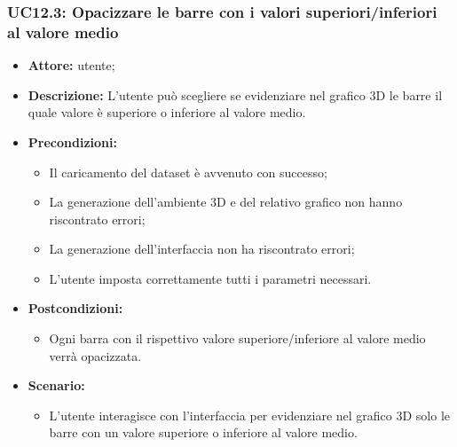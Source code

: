 \subsubsection{UC12.3: Opacizzare le barre con i valori superiori/inferiori al valore medio}
\begin{itemize}    
    \item \textbf{Attore:} utente;
    \item \textbf{Descrizione:} L'utente può scegliere se evidenziare nel grafico 3D le barre il quale valore è superiore o inferiore al valore medio.
    \item \textbf{Precondizioni:}    
        \begin{itemize}
            \item Il caricamento del dataset è avvenuto con successo;
            \item La generazione dell'ambiente 3D e del relativo grafico non hanno riscontrato errori;
            \item La generazione dell'interfaccia non ha riscontrato errori;
            \item L'utente imposta correttamente tutti i parametri necessari.
        \end{itemize}    
    \item \textbf{Postcondizioni:}
        \begin{itemize}
            \item Ogni barra con il rispettivo valore superiore/inferiore al valore medio verrà opacizzata.
        \end{itemize}    
    \item \textbf{Scenario:} 
        \begin{itemize}
            \item L'utente interagisce con l'interfaccia per evidenziare nel grafico 3D solo le barre con un valore superiore o inferiore al valore medio.
        \end{itemize}
\end{itemize}

